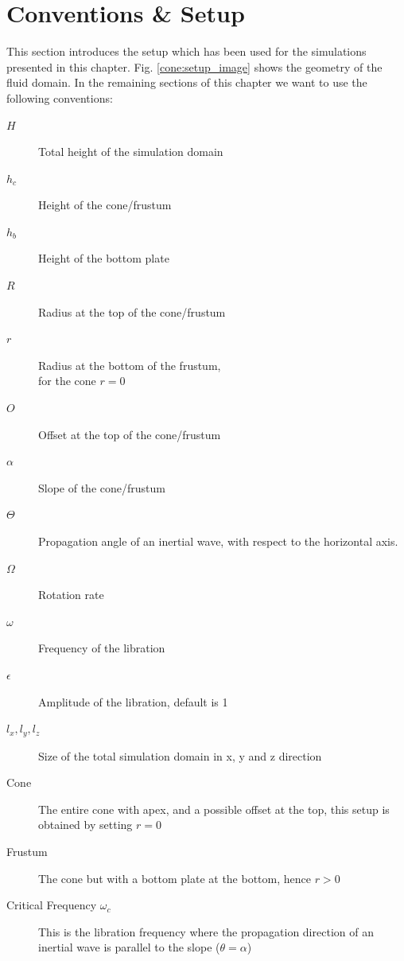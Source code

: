 \section{Conventions \& Setup}
\label{cone:convsetup}

This section introduces the setup which has been used for the simulations presented in this chapter.
Fig. \ref{cone:setup_image} shows the geometry of the fluid domain.
In the remaining sections of this chapter we want to use the following conventions:

\begin{multicols}{2}
\begin{description}
    \item[$H$]{Total height of the simulation domain}
    \item[$h_c$]{Height of the cone/frustum}
    \item[$h_b$]{Height of the bottom plate}
    \item[$R$]{Radius at the top of the cone/frustum}
    \item[$r$]{Radius at the bottom  of the frustum,\\ for the cone $r=0$}
    \item[$O$]{Offset at the top of the cone/frustum}
    \item[$\alpha$]{Slope of the cone/frustum}
    \item[$\Theta$]{Propagation angle of an inertial wave, with respect to the horizontal axis.}
    \item[$\Omega$]{Rotation rate}
    \item[$\omega$]{Frequency of the libration}
    \item[$\epsilon$]{Amplitude of the libration, default is 1}%
    \item[$l_x, l_y, l_z$]{Size of the total simulation domain in x, y and z direction}
    \item[Cone] {The entire cone with apex, and a possible offset at the top, this setup is obtained by setting $r=0$}
    \item[Frustum]{The cone but with a bottom plate at the bottom, hence $r>0$}
    \item[Critical Frequency $\omega_c$]{This is the libration frequency where the propagation direction of an inertial wave is parallel to the slope ($\theta=\alpha$)}
\end{description}
\end{multicols}


